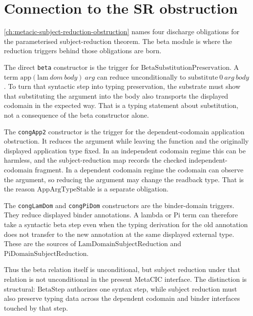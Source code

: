 \section{Connection to the SR obstruction}
\label{sec:metacic-beta-audit-map-sr-connection}

\autoref{ch:metacic-subject-reduction-obstruction} names four discharge
obligations for the parameterised subject-reduction theorem. The beta module is
where the reduction triggers behind those obligations are born.

The direct \texttt{beta} constructor is the trigger for
$\mathrm{BetaSubstitutionPreservation}$. A term
$\mathrm{app}(\mathrm{lam}\ dom\ body)\ arg$ can reduce unconditionally to
$\mathrm{substitute}\ 0\ arg\ body$. To turn that syntactic step into typing
preservation, the substrate must show that substituting the argument into the
body also transports the displayed codomain in the expected way. That is a
typing statement about substitution, not a consequence of the beta constructor
alone.

The \texttt{congApp2} constructor is the trigger for the dependent-codomain
application obstruction. It reduces the argument while leaving the function and
the originally displayed application type fixed. In an independent codomain
regime this can be harmless, and the subject-reduction map records the checked
independent-codomain fragment. In a dependent codomain regime the codomain can
observe the argument, so reducing the argument may change the readback type.
That is the reason $\mathrm{AppArgTypeStable}$ is a separate obligation.

The \texttt{congLamDom} and \texttt{congPiDom} constructors are the binder-domain
triggers. They reduce displayed binder annotations. A lambda or Pi term can
therefore take a syntactic beta step even when the typing derivation for the
old annotation does not transfer to the new annotation at the same displayed
external type. These are the sources of
$\mathrm{LamDomainSubjectReduction}$ and
$\mathrm{PiDomainSubjectReduction}$.

Thus the beta relation itself is unconditional, but subject reduction under that
relation is not unconditional in the present MetaCIC interface. The distinction
is structural: $\mathrm{BetaStep}$ authorizes one syntax step, while subject
reduction must also preserve typing data across the dependent codomain and
binder interfaces touched by that step.


